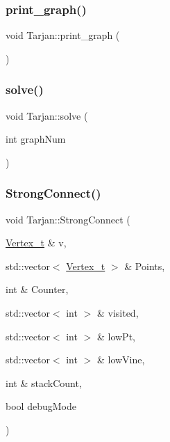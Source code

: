 \mbox{\label{class_tarjan_a0ef20e22407703c87c880898c8ad5745}} 
\subsubsection{\texorpdfstring{print\+\_\+graph()}{print\_graph()}}
{\footnotesize\ttfamily void Tarjan\+::print\+\_\+graph (\begin{DoxyParamCaption}{ }\end{DoxyParamCaption})}

\mbox{\label{class_tarjan_af94d48b6e78c292bd1aa465d37d89769}} 
\subsubsection{\texorpdfstring{solve()}{solve()}}
{\footnotesize\ttfamily void Tarjan\+::solve (\begin{DoxyParamCaption}\item[{int}]{graph\+Num }\end{DoxyParamCaption})}

\mbox{\label{class_tarjan_ac76fd1419a2de2dbf34c6ff1d4cc55e2}} 
\subsubsection{\texorpdfstring{Strong\+Connect()}{StrongConnect()}}
{\footnotesize\ttfamily void Tarjan\+::\+Strong\+Connect (\begin{DoxyParamCaption}\item[{\hyperlink{class_graph_component_ae67114a6ce5a001dc35e1996e1b45aa0}{Vertex\+\_\+t} \&}]{v,  }\item[{std\+::vector$<$ \hyperlink{class_graph_component_ae67114a6ce5a001dc35e1996e1b45aa0}{Vertex\+\_\+t} $>$ \&}]{Points,  }\item[{int \&}]{Counter,  }\item[{std\+::vector$<$ int $>$ \&}]{visited,  }\item[{std\+::vector$<$ int $>$ \&}]{low\+Pt,  }\item[{std\+::vector$<$ int $>$ \&}]{low\+Vine,  }\item[{int \&}]{stack\+Count,  }\item[{bool}]{debug\+Mode }\end{DoxyParamCaption})}



